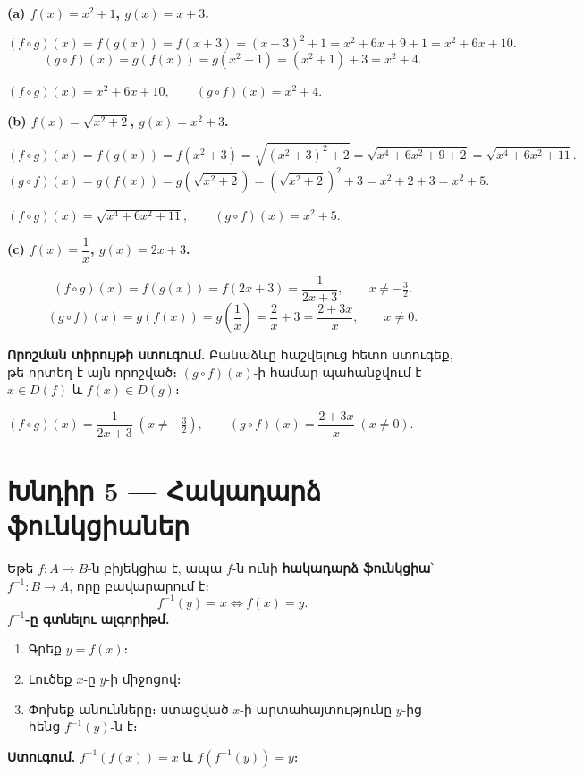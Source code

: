 \documentclass[12pt, a4paper]{article}
\begin{document}
\textbf{(a)\; $f(x) = x^2 + 1$, \;$g(x) = x + 3$.}

\[
  (f \circ g)(x) = f(g(x)) = f(x+3) = (x+3)^2 + 1 = x^2 + 6x + 9 + 1 = x^2 + 6x + 10.
\]
\[
  (g \circ f)(x) = g(f(x)) = g(x^2+1) = (x^2+1) + 3 = x^2 + 4.
\]

\begin{answerbox}
$(f \circ g)(x) = x^2 + 6x + 10, \qquad (g \circ f)(x) = x^2 + 4.$
\end{answerbox}

\bigskip
\textbf{(b)\; $f(x) = \sqrt{x^2 + 2}$, \;$g(x) = x^2 + 3$.}

\[
  (f \circ g)(x) = f(g(x)) = f(x^2 + 3) = \sqrt{(x^2+3)^2 + 2} = \sqrt{x^4 + 6x^2 + 9 + 2} = \sqrt{x^4 + 6x^2 + 11}.
\]
\[
  (g \circ f)(x) = g(f(x)) = g\!\left(\sqrt{x^2+2}\right) = \left(\sqrt{x^2+2}\right)^2 + 3 = x^2 + 2 + 3 = x^2 + 5.
\]

\begin{answerbox}
$(f \circ g)(x) = \sqrt{x^4 + 6x^2 + 11}, \qquad (g \circ f)(x) = x^2 + 5.$
\end{answerbox}

\bigskip
\textbf{(c)\; $f(x) = \dfrac{1}{x}$, \;$g(x) = 2x + 3$.}

\[
  (f \circ g)(x) = f(g(x)) = f(2x+3) = \frac{1}{2x+3}, \qquad x \neq -\tfrac{3}{2}.
\]
\[
  (g \circ f)(x) = g(f(x)) = g\!\left(\frac{1}{x}\right) = \frac{2}{x} + 3 = \frac{2 + 3x}{x}, \qquad x \neq 0.
\]

\textbf{Որոշման տիրույթի ստուգում.}\; Բանաձևը հաշվելուց հետո ստուգեք, թե որտեղ է այն որոշված։ $(g \circ f)(x)$-ի համար պահանջվում է $x \in D(f)$ և $f(x) \in D(g)$։

\begin{answerbox}
$(f \circ g)(x) = \dfrac{1}{2x+3}\;(x \neq -\frac{3}{2}), \qquad
 (g \circ f)(x) = \dfrac{2+3x}{x}\;(x \neq 0).$
\end{answerbox}

\newpage
\section{Խնդիր 5 — Հակադարձ ֆունկցիաներ}

\begin{theorybox}
Եթե $f : A \to B$-ն բիյեկցիա է, ապա $f$-ն ունի \textbf{հակադարձ ֆունկցիա}՝ $f^{-1} : B \to A$, որը բավարարում է։
\[
  f^{-1}(y) = x \iff f(x) = y.
\]
\textbf{$f^{-1}$-ը գտնելու ալգորիթմ.}
\begin{enumerate}[nosep]
  \item Գրեք $y = f(x)$։
  \item Լուծեք $x$-ը $y$-ի միջոցով։
  \item Փոխեք անունները։ ստացված $x$-ի արտահայտությունը $y$-ից հենց $f^{-1}(y)$-ն է։
\end{enumerate}

\textbf{Ստուգում.} $f^{-1}(f(x)) = x$ և $f(f^{-1}(y)) = y$։
\end{theorybox}
\end{document}
